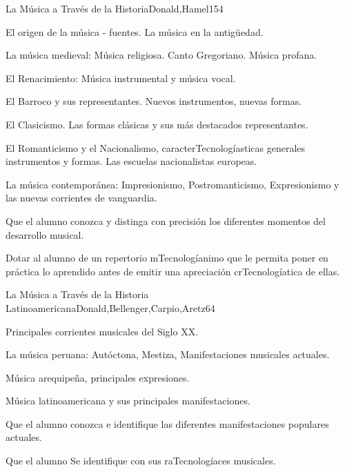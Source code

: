 \begin{syllabus}
\begin{unit}{La Música a Través de la Historia}{Donald,Hamel}{15}{4}
\begin{topics}
	\item El origen de la música - fuentes. La música en la antigüedad.
	\item La música medieval: Música religiosa.  Canto Gregoriano. Música profana.
	\item El Renacimiento: Música instrumental y música vocal.
	\item El Barroco y sus representantes. Nuevos instrumentos, nuevas formas.
	\item El Clasicismo. Las formas clásicas y sus más destacados representantes.
	\item El Romanticismo y el Nacionalismo, caracterTecnologíasticas generales instrumentos y formas. Las escuelas nacionalistas europeas.
	\item La música contemporánea: Impresionismo, Postromanticismo, Expresionismo y las nuevas corrientes de vanguardia.
\end{topics}
\begin{unitgoals}
	\item Que el alumno conozca y distinga con precisión los diferentes momentos del desarrollo musical.
	\item Dotar al alumno de un repertorio mTecnologíanimo que le permita poner en práctica lo aprendido antes de emitir una apreciación crTecnologíatica de ellas.
\end{unitgoals}
\end{unit}

\begin{unit}{La Música a Través de la Historia Latinoamericana}{Donald,Bellenger,Carpio,Aretz}{6}{4}
\begin{topics}
	\item Principales corrientes musicales del Siglo XX.
	\item La música peruana: Autóctona, Mestiza, Manifestaciones musicales actuales.
	\item Música arequipeña, principales expresiones.
	\item Música latinoamericana y sus principales manifestaciones.
\end{topics}
\begin{unitgoals}
	\item Que el alumno conozca e identifique las diferentes manifestaciones populares actuales. 
	\item Que el alumno Se identifique con sus raTecnologíaces musicales.
\end{unitgoals}
\end{unit}



\begin{coursebibliography}
\end{coursebibliography}

\end{syllabus}
